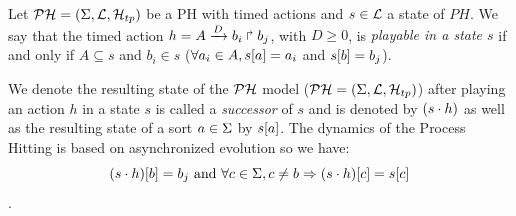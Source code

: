 \begin{definition} 
\label{def:playableAction}
Let $\mathcal{PH} = (\Sigma,\mathcal{L},\mathcal{H}_{tp})$ be a PH with timed actions and $s \in \mathcal{L}$ a state of $PH$.
We say that the timed action $h = A\xrightarrow{D} b_i \Rsh b_j$, with $D \geq 0 $,
is \emph{playable in a state $s$} if and only if
$A \subseteq s$ and $b_i \in s$ (\ie$ \forall a_i \in A, {s[a]} = a_i$ and ${s[b]}=b_j$).
\end{definition}

%
%
%
%
We denote the resulting state of the $\mathcal{PH}$ model ($\mathcal{PH} = (\Sigma,\mathcal{L},\mathcal{H}_{tp})$) after playing an action $h$ in a state $s$ is called a \emph{successor} of $s$ and is denoted by $(s \cdot h)$ as well as the resulting state of a sort $a \in \Sigma$ by ${s[a]}$. The dynamics of the Process Hitting is based on asynchronized evolution so we have: $${(s \cdot h)[b]} = b_j \text{ and } \forall c \in \Sigma, c \neq b \Rightarrow {(s \cdot h)[c]}={s[c]}$$.

